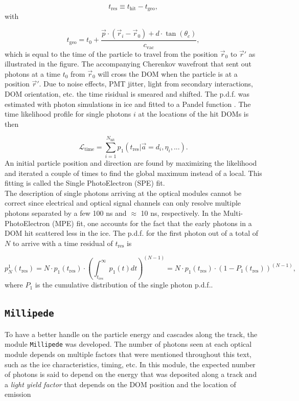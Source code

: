 \begin{equation}
t_{\textrm{res}} \equiv t_{\textrm{hit}} - t_{\textrm{geo}},
\end{equation}
\noindent with

\begin{equation}
t_\textrm{geo} = t_0 + \frac{\vec{p} \cdot (\vec{r}_i - \vec{r}_0) + d\cdot \tan (\theta_c)}{c_\textrm{vac}},
\end{equation}
\noindent which is equal to the time of the particle to travel from the position $\vec{r}_0$ to $\vec{r}'$ as illustrated in the figure. The accompanying Cherenkov wavefront that sent out photons at a time $t_0$ from $\vec{r}_0$ will cross the DOM when the particle is at a position $\vec{r}'$. Due to noise effects, PMT jitter, light from secondary interactions, DOM orientation, etc. the time risidual is smeared and shifted. The p.d.f. was estimated with photon simulations in ice and fitted to a Pandel function \cite{Ahrens:2003fg}. The time likelihood profile for single photons $i$ at the locations of the hit DOMs is then

\begin{equation}
\mathcal{L}_\textrm{time} = \sum^{N_\textrm{hit}}_{i=1} p_1 (t_\textrm{res} | \vec{a} = {d_i,\eta_i,...}).
\end{equation}
\noindent An initial particle position and direction are found by maximizing the likelihood and iterated a couple of times to find the global maximum instead of a local. This fitting is called the Single PhotoElectron (SPE) fit.\\

\noindent The description of single photons arriving at the optical modules cannot be correct since electrical and optical signal channels can only resolve multiple photons separated by a few 100 ns and $\approx$ 10 ns, respectively. In the Multi-PhotoElectron (MPE) fit, one accounts for the fact that the early photons in a DOM hit scattered less in the ice. The p.d.f. for the first photon out of a total of $N$ to arrive with a time residual of $t_\textrm{res}$ is

\begin{equation}
p^1_N (t_\textrm{res}) = N \cdot p_1(t_\textrm{res}) \cdot \left(\int^\infty_{t_\textrm{res}} p_1(t) dt \right)^{(N-1)} = N \cdot p_1 (t_\textrm{res}) \cdot (1-P_1 (t_\textrm{res}))^{(N-1)},
\end{equation}
\noindent where $P_1$ is the cumulative distribution of the single photon p.d.f..
\subsection{\texttt{Millipede}}
\label{subsec:millipede}
To have a better handle on the particle energy and cascades along the track, the module \texttt{Millipede} was developed. The number of photons seen at each optical module depends on multiple factors that were mentioned throughout this text, such as the ice characteristics, timing, etc. In this module, the expected number of photons is said to depend on the energy that was deposited along a track and a \textit{light yield factor} that depends on the DOM position and the location of emission

